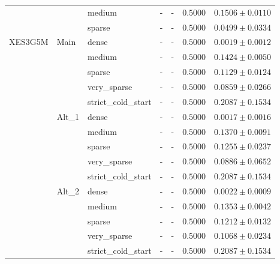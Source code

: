 \begin{table}[H]
{\begin{tabular}{lllcccc}
 &  & medium & - & - & $0.5000$ & $0.1506 \pm 0.0110$ \\
 &  & sparse & - & - & $0.5000$ & $0.0499 \pm 0.0334$ \\
\midrule
XES3G5M & Main & dense & - & - & $0.5000$ & $0.0019 \pm 0.0012$ \\
 &  & medium & - & - & $0.5000$ & $0.1424 \pm 0.0050$ \\
 &  & sparse & - & - & $0.5000$ & $0.1129 \pm 0.0124$ \\
 &  & very\_sparse & - & - & $0.5000$ & $0.0859 \pm 0.0266$ \\
 &  & strict\_cold\_start & - & - & $0.5000$ & $0.2087 \pm 0.1534$ \\
 & Alt\_1 & dense & - & - & $0.5000$ & $0.0017 \pm 0.0016$ \\
 &  & medium & - & - & $0.5000$ & $0.1370 \pm 0.0091$ \\
 &  & sparse & - & - & $0.5000$ & $0.1255 \pm 0.0237$ \\
 &  & very\_sparse & - & - & $0.5000$ & $0.0886 \pm 0.0652$ \\
 &  & strict\_cold\_start & - & - & $0.5000$ & $0.2087 \pm 0.1534$ \\
 & Alt\_2 & dense & - & - & $0.5000$ & $0.0022 \pm 0.0009$ \\
 &  & medium & - & - & $0.5000$ & $0.1353 \pm 0.0042$ \\
 &  & sparse & - & - & $0.5000$ & $0.1212 \pm 0.0132$ \\
 &  & very\_sparse & - & - & $0.5000$ & $0.1068 \pm 0.0234$ \\
 &  & strict\_cold\_start & - & - & $0.5000$ & $0.2087 \pm 0.1534$ \\
\bottomrule
\end{tabular}
}
\end{table}
